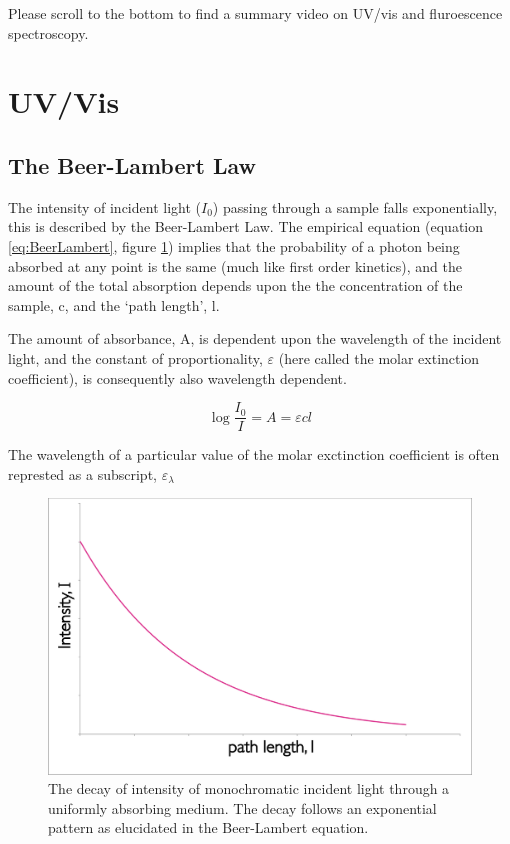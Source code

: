 \documentclass[
]{book}
\begin{document}
Please scroll to the bottom to find a summary video on UV/vis and fluroescence spectroscopy.

\hypertarget{sec:UV}{%
\section{UV/Vis}\label{sec:UV}}

\hypertarget{the-beer-lambert-law}{%
\subsection{The Beer-Lambert Law}\label{the-beer-lambert-law}}

The intensity of incident light (\(I_0\)) passing through a sample falls exponentially, this is described by the Beer-Lambert Law. The empirical equation (equation \eqref{eq:BeerLambert}, figure \ref{fig:BeerLambert}) implies that the probability of a photon being absorbed at any point is the same (much like first order kinetics), and the amount of the total absorption depends upon the the concentration of the sample, c, and the `path length', l.

The amount of absorbance, A, is dependent upon the wavelength of the incident light, and the constant of proportionality, \(\varepsilon\) (here called the molar extinction coefficient), is consequently also wavelength dependent.

\begin{equation}
\log \frac{I_0}{I}=A=\varepsilon cl
\label{eq:BeerLambert}
\end{equation}

The wavelength of a particular value of the molar exctinction coefficient is often represted as a subscript, \(\varepsilon _\lambda\)

\begin{figure}

{\centering \includegraphics[width=0.5\linewidth]{images/BeerLambert} 

}

\caption{The decay of intensity of monochromatic incident light through a uniformly absorbing medium. The decay follows an exponential pattern as elucidated in the Beer-Lambert equation.}\label{fig:BeerLambert}
\end{figure}
\end{document}
